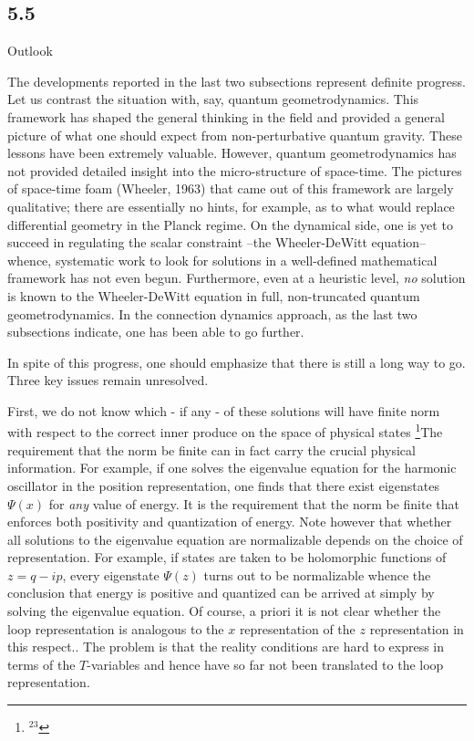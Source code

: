 \goodbreak
\subsection{5.5}{Outlook}

The developments reported in the last two subsections represent definite
progress. Let us contrast the situation with, say, quantum geometrodynamics.
This framework has shaped the general thinking in the field and provided a
general picture of what one should expect from non-perturbative quantum
gravity. These lessons have been extremely valuable. However, quantum
geometrodynamics has not provided detailed insight into the micro-structure
of space-time. The pictures of space-time foam (Wheeler, 1963) that came out
of this framework are largely qualitative; there are essentially no hints,
for example, as to what would replace differential geometry in the Planck
regime. On the dynamical side, one is yet to succeed in regulating the
scalar constraint --the Wheeler-DeWitt equation-- whence, systematic work to
look for solutions in a well-defined mathematical framework has not even begun.
Furthermore, even at a heuristic level, {\it no} solution is known to the
Wheeler-DeWitt equation in full, non-truncated quantum geometrodynamics. In
the connection dynamics approach, as the last two subsections indicate, one
has been able to go further.

In spite of this progress, one should emphasize that there is still a long
way to go. Three key issues remain unresolved.

First, we do not know which - if any - of these solutions will have finite
norm with respect to the correct inner produce on the space of physical states
\footnote{$^{23}$}{The requirement that the norm be finite can in fact carry the
crucial physical information. For example, if one solves the eigenvalue
equation for the harmonic oscillator in the position representation, one finds
that there exist eigenstates $\Psi(x)$ for {\it any} value of energy. It is
the requirement that the norm be finite that enforces both positivity and
quantization of energy. Note however that whether all solutions to the
eigenvalue equation are normalizable depends on the choice of representation.
For example, if states are taken to be holomorphic functions of $z=q-ip$,
every eigenstate $\Psi(z)$ turns out to be normalizable whence the conclusion
that energy is positive and quantized can be arrived at simply by solving the
eigenvalue equation. Of course, a priori it is not clear whether the loop
representation is analogous to the $x$ representation of the $z$ representation
in this respect.}.
The problem is that the reality conditions are hard to express in terms of
the $T$-variables and hence have so far not been translated to the loop
representation.

